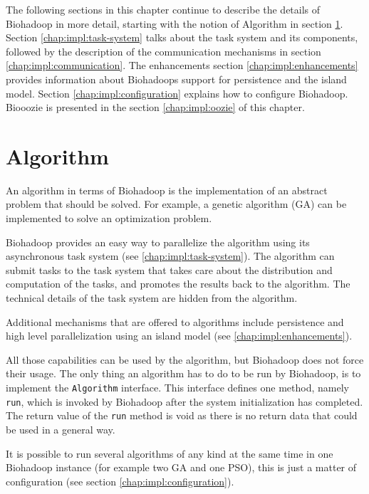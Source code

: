 The following sections in this chapter continue to describe the details of Biohadoop in more detail, starting with the notion of Algorithm in section \ref{chap:impl:algorithm}. Section \ref{chap:impl:task-system} talks about the task system and its components, followed by the description of the communication mechanisms in section \ref{chap:impl:communication}. The enhancements section \ref{chap:impl:enhancements} provides information about Biohadoops support for persistence and the island model. Section \ref{chap:impl:configuration} explains how to configure Biohadoop. Biooozie is presented in the section \ref{chap:impl:oozie} of this chapter.

\section{Algorithm}
\label{chap:impl:algorithm}
An algorithm in terms of Biohadoop is the implementation of an abstract problem that should be solved. For example, a genetic algorithm (GA) can be implemented to solve an optimization problem.

Biohadoop provides an easy way to parallelize the algorithm using its asynchronous task system (see \ref{chap:impl:task-system}). The algorithm can submit tasks to the task system that takes care about the distribution and computation of the tasks, and promotes the results back to the algorithm. The technical details of the task system are hidden from the algorithm.

Additional mechanisms that are offered to algorithms include persistence and high level parallelization using an island model (see \ref{chap:impl:enhancements}).

All those capabilities can be used by the algorithm, but Biohadoop does not force their usage. The only thing an algorithm has to do to be run by Biohadoop, is to implement the \texttt{Algorithm} interface. This interface defines one method, namely \texttt{run}, which is invoked by Biohadoop after the system initialization has completed. The return value of the \texttt{run} method is void as there is no return data that could be used in a general way.

It is possible to run several algorithms of any kind at the same time in one Biohadoop instance (for example two GA and one PSO), this is just a matter of configuration (see section \ref{chap:impl:configuration}).
   
